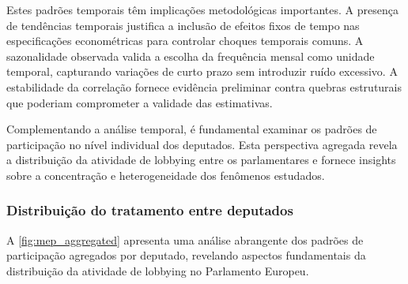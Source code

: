 

Estes padrões temporais têm implicações metodológicas importantes. A presença de tendências temporais justifica a inclusão de efeitos fixos de tempo nas especificações econométricas para controlar choques temporais comuns. A sazonalidade observada valida a escolha da frequência mensal como unidade temporal, capturando variações de curto prazo sem introduzir ruído excessivo. A estabilidade da correlação fornece evidência preliminar contra quebras estruturais que poderiam comprometer a validade das estimativas.


Complementando a análise temporal, é fundamental examinar os padrões de participação no nível individual dos deputados. Esta perspectiva agregada revela a distribuição da atividade de lobbying entre os parlamentares e fornece insights sobre a concentração e heterogeneidade dos fenômenos estudados.

\subsubsection{Distribuição do tratamento entre deputados}

A \autoref{fig:mep_aggregated} apresenta uma análise abrangente dos padrões de participação agregados por deputado, revelando aspectos fundamentais da distribuição da atividade de lobbying no Parlamento Europeu.

